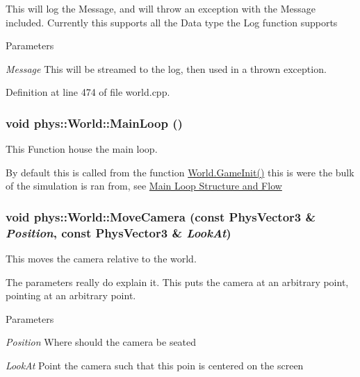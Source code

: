 This will log the Message, and will throw an exception with the Message included. Currently this supports all the Data type the Log function supports 
\begin{DoxyParams}{Parameters}
\item[{\em Message}]This will be streamed to the log, then used in a thrown exception. \end{DoxyParams}


Definition at line 474 of file world.cpp.

\hypertarget{classphys_1_1World_af1d9e36d43f5e50543fa2351a32c8362}{
\subsubsection[{MainLoop}]{\setlength{\rightskip}{0pt plus 5cm}void phys::World::MainLoop ()}}
\label{da/ddf/classphys_1_1World_af1d9e36d43f5e50543fa2351a32c8362}


This Function house the main loop. 

By default this is called from the function \hyperlink{classphys_1_1World_a21cc36be08a61f40619584d4c438936b}{World.GameInit()} this is were the bulk of the simulation is ran from, see \hyperlink{mainloop1}{Main Loop Structure and Flow} \hypertarget{classphys_1_1World_ad461d55f869f8aef72d0f0e0eb1b04dd}{
\subsubsection[{MoveCamera}]{\setlength{\rightskip}{0pt plus 5cm}void phys::World::MoveCamera (const {\bf PhysVector3} \& {\em Position}, \/  const {\bf PhysVector3} \& {\em LookAt})}}
\label{da/ddf/classphys_1_1World_ad461d55f869f8aef72d0f0e0eb1b04dd}


This moves the camera relative to the world. 

The parameters really do explain it. This puts the camera at an arbitrary point, pointing at an arbitrary point. 
\begin{DoxyParams}{Parameters}
\item[{\em Position}]Where should the camera be seated \item[{\em LookAt}]Point the camera such that this poin is centered on the screen \end{DoxyParams}


